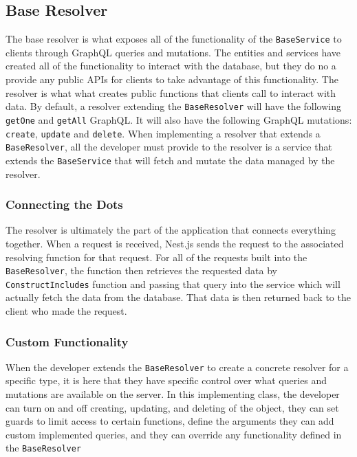 \subsection{Base Resolver}
The base resolver is what exposes all of the functionality of the \verb!BaseService! to clients through GraphQL queries and mutations. The entities and services have created all of the functionality to interact with the database, but they do no a provide any public APIs for clients to take advantage of this functionality.  The resolver is what what creates public functions that clients call to interact with data. By default, a resolver extending the \verb!BaseResolver! will have the following \verb!getOne! and \verb!getAll! GraphQL.  It will also have the following GraphQL mutations: \verb!create!, \verb!update! and \verb!delete!.  When implementing a resolver that extends a \verb!BaseResolver!, all the developer must provide to the resolver is a service that extends the \verb!BaseService! that will fetch and mutate the data managed by the resolver.

\subsubsection{Connecting the Dots}

The resolver is ultimately the part of the application that connects everything together.  When a request is received, Nest.js sends the request to the associated resolving function for that request.  For all of the requests built into the \verb!BaseResolver!, the function then retrieves the requested data by \verb!ConstructIncludes! function and passing that query into the service which will actually fetch the data from the database.  That data is then returned back to the client who made the request.

\subsubsection{Custom Functionality}

When the developer extends the \verb!BaseResolver! to create a concrete resolver for a specific type, it is here that they have specific control over what queries and mutations are available on the server.  In this implementing class, the developer can turn on and off creating, updating, and deleting of the object, they can set guards to limit access to certain functions, define the arguments they can add custom implemented queries, and they can override any functionality defined in the \verb!BaseResolver!